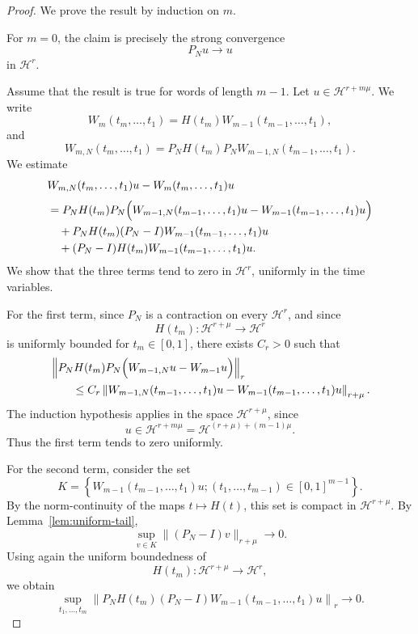\documentclass[11pt]{amsart}
\theoremstyle{plain}
\theoremstyle{definition}
\theoremstyle{remark}
\newcommand{\Hilb}{\mathcal H}
\begin{document}
\begin{proof}
We prove the result by induction on \(m\).

For \(m=0\), the claim is precisely the strong convergence
\[
        P_Nu\to u
\]
in \(\Hilb^r\).

Assume that the result is true for words of length \(m-1\).  Let
\(u\in\Hilb^{r+m\mu}\).  We write
\[
        W_m(t_m,\ldots,t_1)
        =
        H(t_m)W_{m-1}(t_{m-1},\ldots,t_1),
\]
and
\[
        W_{m,N}(t_m,\ldots,t_1)
        =
        P_NH(t_m)P_NW_{m-1,N}(t_{m-1},\ldots,t_1).
\]
We estimate
\[
\begin{aligned}
& W_{m,N}(t_m,\ldots,t_1)u
  -
  W_m(t_m,\ldots,t_1)u                                      \\[1mm]
& =
  P_NH(t_m)P_N
  \Bigl(
        W_{m-1,N}(t_{m-1},\ldots,t_1)u
        -
        W_{m-1}(t_{m-1},\ldots,t_1)u
  \Bigr)                                                     \\
&\quad
  +
  P_NH(t_m)(P_N-I)
  W_{m-1}(t_{m-1},\ldots,t_1)u                               \\
&\quad
  +
  (P_N-I)H(t_m)
  W_{m-1}(t_{m-1},\ldots,t_1)u .
\end{aligned}
\]
We show that the three terms tend to zero in \(\Hilb^r\), uniformly in
the time variables.

For the first term, since \(P_N\) is a contraction on every
\(\Hilb^r\), and since
\[
        H(t_m):\Hilb^{r+\mu}\to\Hilb^r
\]
is uniformly bounded for \(t_m\in[0,1]\), there exists \(C_r>0\) such
that
\[
\begin{aligned}
&\left\|
P_NH(t_m)P_N
\Bigl(
W_{m-1,N}u-W_{m-1}u
\Bigr)
\right\|_r                                             \\
&\qquad\leq
C_r
\left\|
W_{m-1,N}(t_{m-1},\ldots,t_1)u
-
W_{m-1}(t_{m-1},\ldots,t_1)u
\right\|_{r+\mu}.
\end{aligned}
\]
The induction hypothesis applies in the space \(\Hilb^{r+\mu}\), since
\[
        u\in\Hilb^{r+m\mu}
        =
        \Hilb^{(r+\mu)+(m-1)\mu}.
\]
Thus the first term tends to zero uniformly.

For the second term, consider the set
\[
        K
        =
        \left\{
        W_{m-1}(t_{m-1},\ldots,t_1)u;
        (t_1,\ldots,t_{m-1})\in[0,1]^{m-1}
        \right\}.
\]
By the norm-continuity of the maps \(t\mapsto H(t)\), this set is
compact in \(\Hilb^{r+\mu}\).  By Lemma~\ref{lem:uniform-tail},
\[
        \sup_{v\in K}\|(P_N-I)v\|_{r+\mu}
        \longrightarrow0.
\]
Using again the uniform boundedness of
\[
        H(t_m):\Hilb^{r+\mu}\to\Hilb^r,
\]
we obtain
\[
        \sup_{t_1,\ldots,t_m}
        \left\|
        P_NH(t_m)(P_N-I)
        W_{m-1}(t_{m-1},\ldots,t_1)u
        \right\|_r
        \longrightarrow0.
\]


\end{proof}
\end{document}
